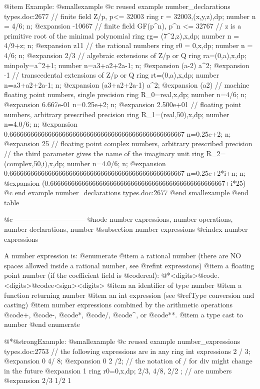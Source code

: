 {{{{{{@item Example:
@smallexample
@c reused example number_declarations types.doc:2677 
  // finite field Z/p, p<= 32003
  ring r = 32003,(x,y,z),dp;
  number n = 4/6;
  n;
@expansion{} -10667
  // finite field GF(p^n), p^n <= 32767
  // z is a primitive root of the minimal polynomial
  ring rg= (7^2,z),x,dp;
  number n = 4/9+z;
  n;
@expansion{} z11
  // the rational numbers
  ring r0 = 0,x,dp;
  number n = 4/6;
  n;
@expansion{} 2/3
  // algebraic extensions of Z/p or Q
  ring ra=(0,a),x,dp;
  minpoly=a^2+1;
  number n=a3+a2+2a-1;
  n;
@expansion{} (a-2)
  a^2;
@expansion{} -1
  // transcedental extensions of Z/p or Q
  ring rt=(0,a),x,dp;
  number n=a3+a2+2a-1;
  n;
@expansion{} (a3+a2+2a-1)
  a^2;
@expansion{} (a2)
  // machine floating point numbers, single precision
  ring R_0=real,x,dp;
  number n=4/6;
  n;
@expansion{} 6.667e-01
  n=0.25e+2;
  n;
@expansion{} 2.500e+01
  // floating point numbers, arbitrary prescribed precision
  ring R_1=(real,50),x,dp;
  number n=4.0/6;
  n;
@expansion{} 0.66666666666666666666666666666666666666666666666667
  n=0.25e+2;
  n;
@expansion{} 25
  // floating point complex numbers, arbitrary prescribed precision
  // the third parameter gives the name of the imaginary unit
  ring R_2=(complex,50,i),x,dp;
  number n=4.0/6;
  n;
@expansion{} 0.66666666666666666666666666666666666666666666666667
  n=0.25e+2*i+n;
  n;
@expansion{} (0.66666666666666666666666666666666666666666666666667+i*25)
@c end example number_declarations types.doc:2677
@end smallexample
@end table

@c ------------------------------
@node number expressions, number operations, number declarations, number
@subsection number expressions
@cindex number expressions

A number expression is:
@enumerate
@item
a rational number (there are NO spaces allowed inside a rational number,
see @ref{int expressions})
@item
a floating point number (if the coefficient field is @code{real}):
@*<digits>@code{.}<digits>@code{e}<sign><digits>
@item
an identifier of type number
@item
a function returning number
@item
an int expression (see @ref{Type conversion and casting})
@item
number expressions combined by the arithmetic operations
@code{+}, @code{-}, @code{*}, @code{/}, @code{^}, or @code{**}.
@item
a type cast to number
@end enumerate

@*@strong{Example:}
@smallexample
@c reused example number_expressions types.doc:2753 
  // the following expressions are in any ring int expressions
  2 / 3;
@expansion{} 0
  4/ 8;
@expansion{} 0
  2 /2;   // the notation of / for div might change in the future
@expansion{} 1
  ring r0=0,x,dp;
  2/3, 4/8, 2/2 ; // are numbers
@expansion{} 2/3 1/2 1

}}}}}}
